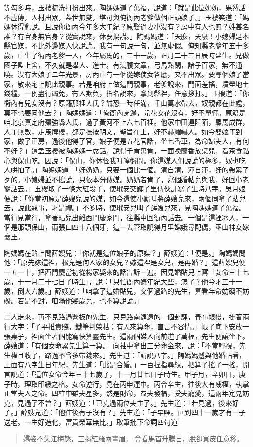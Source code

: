 等勾多時，玉樓梳洗打扮出來。陶媽媽道了萬福，說道：「就是此位奶奶，果然話不虛傳，人材出眾，蓋世無雙，堪可與俺衙內老爹做個正頭娘子。」玉樓笑道：「媽媽休得亂說。且說你衙內今年多大年紀？原娶過妻小沒有？房中有人也無？姓甚名誰？有官身無官身？從實說來，休要搗謊。」陶媽媽道：「天麼，天麼！小媳婦是本縣官媒，不比外邊媒人快說謊。我有一句說一句，並無虛假。俺知縣老爹年五十多歲，止生了衙內老爹一人，今年屬馬的，三十一歲，正月二十三日辰時建生。見做國子監上舍，不久就是舉人、進士。有滿腹文章，弓馬熟閑，諸子百家，無不通曉。沒有大娘子二年光景，房內止有一個從嫁使女答應，又不出眾。要尋個娘子當家，敬來宅上說此親事。若是咱府上做這門親事，老爹說來，門面差搖，墳塋地土錢糧，一例盡行蠲免，有人欺負，指名說來，拿到縣裡，任意拶打。」玉樓道：「你衙內有兒女沒有？原籍那裡人氏？誠恐一時任滿，千山萬水帶去，奴親都在此處，莫不也要同他去？」陶媽媽道：「俺衙內身邊，兒花女花沒有，好不單徑。原籍是咱北京真定府棗強縣人氏，過了黃河不上六七百裡。他家中田連阡陌，騾馬成群，人丁無數，走馬牌樓，都是撫按明文，聖旨在上，好不赫耀嚇人。如今娶娘子到家，做了正房，過後他得了官，娘子便是五花官誥，坐七香車，為命婦夫人，有何不好？」這孟玉樓被陶媽媽一席話，說得千肯萬肯，一面喚蘭香放桌兒，看茶食點心與保山吃。因說：「保山，你休怪我叮嚀盤問。你這媒人們說謊的極多，奴也吃人哄怕了。」陶媽媽道：「好奶奶，只要一個比一個。清自清，渾自渾，好的帶累了歹的。小媳婦並不搗謊，只依本分做媒。奶奶若肯了，寫個婚帖兒與我，好回小老爹話去。」玉樓取了一條大紅段子，使玳安交鋪子里傅伙計寫了生時八字。吳月娘便說：「你當初原是薛嫂兒說的媒，如今還使小廝叫將薛嫂兒來，兩個同拿了貼兒去，說此親事，才是禮。」不多時，使玳安兒叫了薛嫂兒來，見陶媽媽道了萬福。當行見當行，拿著貼兒出離西門慶家門，往縣中回衙內話去。一個是這裡冰人，一個是那頭保山，兩張口四十八個牙，這一去管取說得月里嫦娥尋配偶，巫山神女嫁襄王。

陶媽媽在路上問薛嫂兒：「你就是這位娘子的原媒？」薛嫂道：「便是。」陶媽媽問他：「原先嫁這裡，根兒是何人家的女兒？嫁這裡是女兒，是再婚？」這薛嫂兒便一五一十，把西門慶當初從楊家娶來的話告訴一遍。因見婚貼兒上寫「女命三十七歲，十一月二十七日子時生」，說：「只怕衙內嫌年紀大些，怎了？他今才三十一歲，倒大六歲。」薛嫂道：「咱拿了這婚貼兒，交個過路的先生，算看年命妨礙不妨礙。若是不對，咱瞞他幾歲兒，也不算說謊。」

二人走來，再不見路過響板的先生，只見路南遠遠的一個卦肆，青布帳幔，掛著兩行大字：「子平推貴賤，鐵筆判榮枯；有人來算命，直言不容情。」帳子底下安放一張桌子，裡面坐著個能寫快算靈先生。這兩個媒人向前道了萬福，先生便讓坐下。薛嫂道：「有個女命累先生算一算。」向袖中拿出三分命金來，說：「不當輕視，先生權且收了，路過不曾多帶錢來。」先生道：「請說八字。」陶媽媽遞與他婚帖看，上面有八字生日年紀，先生道：「此是合婚。」一百捏指尋紋，把算子搖了一搖，開言說道：「這位女命今年三十七歲了，十一月廿七日子時生。甲子月，辛卯日，庚子時，理取印綬之格。女命逆行，見在丙申運中。丙合辛生，往後大有威權，執掌正堂夫人之命。四柱中雖夫星多，然是財命，益夫發福，受夫寵愛，這兩年定見妨克，見過了不曾？」薛嫂道：「已克過兩位夫主了。」先生道：「若見過，後來好了。」薛嫂兒道：「他往後有子沒有？」先生道：「子早哩。直到四十一歲才有一子送老。一生好造化，富貴榮華無比。」取筆批下命詞四句道：
\begin{quote}
嬌姿不失江梅態，三揭紅羅兩畫眉。
會看馬首升騰日，脫卻寅皮任意移。
\end{quote}

